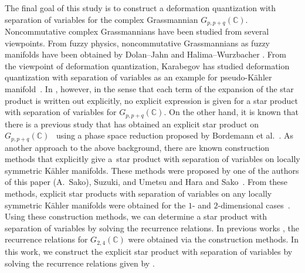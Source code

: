 \documentclass[pdftex]{sigma}
\numberwithin{equation}{section}
\begin{document}
The final goal of this study is to construct a deformation quantization with separation of variables for the complex Grassmannian $G_{p,p+q}(\mathbb{C})$. Noncommutative complex Grassmannians have been studied from several viewpoints. From fuzzy physics, noncommutative Grassmannians as fuzzy manifolds have been obtained by Dolan--Jahn \cite{DJ} and Halima--Wurzbacher \cite{HW}. From the viewpoint of deformation quantization, Karabegov has studied deformation quantization with separation of variables as an example for pseudo-K\"ahler manifold~\cite{Kara4}.
In \cite{Kara4}, however, in the sense that each term of the expansion of the star product is written out explicitly, no explicit expression is given for a star product with separation of variables for $G_{p,p+q}(\mathbb{C})$.
On the other hand, it is known that there is a previous study that has obtained an explicit star product on~$ G_{p,p+q}(\mathbb{C})$~\cite{Schir} using a phase space reduction proposed by Bordemann et al.~\cite{BBEW}. As another approach to the above background, there are known construction methods that explicitly give a~star product with separation of variables on locally symmetric K\"ahler manifolds. These methods were proposed by one of the authors of this paper (A.~Sako), Suzuki, and Umetsu \cite{SSU1,SSU2} and Hara and Sako~\cite{HS1,HS2}.
From these methods, explicit star products with separation of variables on any locally symmetric K\"ahler manifolds were obtained for the $1$- and $2$-dimensional cases~\cite{HS1,HS2,OS_Varna,OS_jrnl}.
Using these construction methods, we can determine a star product with separation of variables by solving the recurrence relations. In previous works \cite{HS1,HS2}, the recurrence relations for $G_{2,4}(\mathbb{C})$ were obtained via the construction methods. In this work, we construct the explicit star product with separation of variables by solving the recurrence relations given by \cite{HS1,HS2}.
\end{document}
